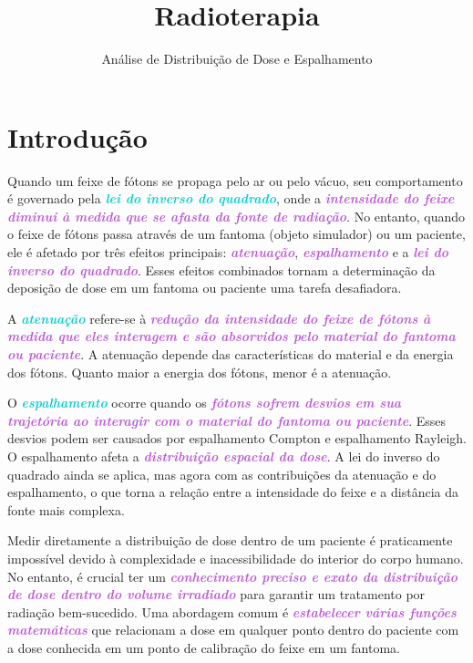 \documentclass[11pt,a4paper]{article}
\title{\LobsterTwo\Huge{Radioterapia}}
\author{\LobsterTwo\LARGE{Análise de Distribuição de Dose e Espalhamento\nocite{*}}}
\date{\LobsterTwo{Dalila Mendonça}}
\begin{document}
	\maketitle

\section{Introdução}

	Quando um feixe de fótons se propaga pelo ar ou pelo vácuo, seu comportamento é governado pela \textcolor{DarkTurquoise}{\textbf{\textit{lei do inverso do quadrado}}}, onde a \textcolor{MediumOrchid}{\textbf{\textit{intensidade do feixe diminui à medida que se afasta da fonte de radiação}}}. No entanto, quando o feixe de fótons passa através de um fantoma (objeto simulador) ou um paciente, ele é afetado por três efeitos principais: \textcolor{MediumOrchid}{\textbf{\textit{atenuação}}}, \textcolor{MediumOrchid}{\textbf{\textit{espalhamento}}} e a \textcolor{MediumOrchid}{\textbf{\textit{lei do inverso do quadrado}}}. Esses efeitos combinados tornam a determinação da deposição de dose em um fantoma ou paciente uma tarefa desafiadora.

	A \textcolor{DarkTurquoise}{\textbf{\textit{atenuação}}} refere-se à \textcolor{MediumOrchid}{\textbf{\textit{redução da intensidade do feixe de fótons à medida que eles interagem e são absorvidos pelo material do fantoma ou paciente}}}. A atenuação depende das características do material e da energia dos fótons. Quanto maior a energia dos fótons, menor é a atenuação. 
	
	O \textcolor{DarkTurquoise}{\textbf{\textit{espalhamento}}} ocorre quando os \textcolor{MediumOrchid}{\textbf{\textit{fótons sofrem desvios em sua trajetória ao interagir com o material do fantoma ou paciente}}}. Esses desvios podem ser causados por espalhamento Compton e espalhamento Rayleigh. O espalhamento afeta a \textcolor{MediumOrchid}{\textbf{\textit{distribuição espacial da dose}}}. A lei do inverso do quadrado ainda se aplica, mas agora com as contribuições da atenuação e do espalhamento, o que torna a relação entre a intensidade do feixe e a distância da fonte mais complexa.

	Medir diretamente a distribuição de dose dentro de um paciente é praticamente impossível devido à complexidade e inacessibilidade do interior do corpo humano. No entanto, é crucial ter um \textcolor{MediumOrchid}{\textbf{\textit{conhecimento preciso e exato da distribuição de dose dentro do volume irradiado}}} para garantir um tratamento por radiação bem-sucedido. Uma abordagem comum é \textcolor{MediumOrchid}{\textbf{\textit{estabelecer várias funções matemáticas}}} que relacionam a dose em qualquer ponto dentro do paciente com a dose conhecida em um ponto de calibração do feixe em um fantoma. 
	
\end{document}
